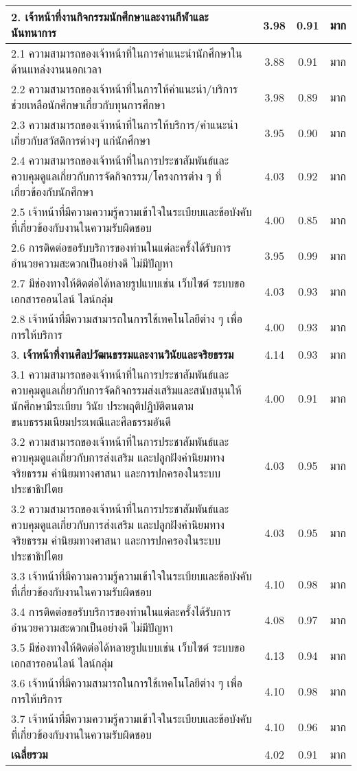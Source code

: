 \begin{longtable}{|>{\raggedright}p{9cm}|c|c|c|}
	2. \textbf{เจ้าหน้าที่งานกิจกรรมนักศึกษาและงานกีฬาและนันทนาการ} & 3.98 & 0.91 & มาก \\ \hline
	2.1 ความสามารถของเจ้าหน้าที่ในการคำแนะนำนักศึกษาในด้านแหล่งงานนอกเวลา & 3.88 & 0.91 & มาก \\ \hline
	2.2 ความสามารถของเจ้าหน้าที่ในการให้คำแนะนำ/บริการช่วยเหลือนักศึกษาเกี่ยวกับทุนการศึกษา & 3.98 & 0.89 & มาก \\ \hline
	2.3 ความสามารถของเจ้าหน้าที่ในการให้บริการ/คำแนะนำเกี่ยวกับสวัสดิการต่างๆ แก่นักศึกษา & 3.95 & 0.90 & มาก \\ \hline
	2.4 ความสามารถของเจ้าหน้าที่ในการประชาสัมพันธ์และควบคุมดูแลเกี่ยวกับการจัดกิจกรรม/โครงการต่าง ๆ ที่เกี่ยวข้องกับนักศึกษา & 4.03 & 0.92 & มาก \\ \hline
	2.5 เจ้าหน้าที่มีความความรู้ความเข้าใจในระเบียบและข้อบังคับที่เกี่ยวข้องกับงานในความรับผิดชอบ & 4.00 & 0.85 & มาก \\ \hline
	2.6 การติดต่อขอรับบริการของท่านในแต่ละครั้งได้รับการอำนวยความสะดวกเป็นอย่างดี ไม่มีปัญหา & 3.95 & 0.99 & มาก \\ \hline
	2.7 มีช่องทางให้ติดต่อได้หลายรูปแบบเช่น เว็บไซต์ ระบบขอเอกสารออนไลน์ ไลน์กลุ่ม & 4.03 & 0.93 & มาก \\ \hline
	2.8 เจ้าหน้าที่มีความสามารถในการใช้เทคโนโลยีต่าง ๆ เพื่อการให้บริการ & 4.00 & 0.93 & มาก \\ \hline
	3. \textbf{เจ้าหน้าที่งานศิลปวัฒนธรรมและงานวินัยและจริยธรรม} & 4.14 & 0.93 & มาก \\ \hline
	3.1 ความสามารถของเจ้าหน้าที่ในการประชาสัมพันธ์และควบคุมดูแลเกี่ยวกับการจัดกิจกรรมส่งเสริมและสนับสนุนให้นักศึกษามีระเบียบ วินัย ประพฤติปฏิบัติตนตามขนบธรรมเนียมประเพณีและศีลธรรมอันดี & 4.00 & 0.91 & มาก \\ \hline
	3.2 ความสามารถของเจ้าหน้าที่ในการประชาสัมพันธ์และควบคุมดูแลเกี่ยวกับการส่งเสริม และปลูกฝังค่านิยมทางจริยธรรม ค่านิยมทางศาสนา และการปกครองในระบบประชาธิปไตย & 4.03 & 0.95 & มาก \\ \hline
	3.2 ความสามารถของเจ้าหน้าที่ในการประชาสัมพันธ์และควบคุมดูแลเกี่ยวกับการส่งเสริม และปลูกฝังค่านิยมทางจริยธรรม ค่านิยมทางศาสนา และการปกครองในระบบประชาธิปไตย & 4.03 & 0.95 & มาก\\\hline
	3.3 เจ้าหน้าที่มีความความรู้ความเข้าใจในระเบียบและข้อบังคับที่เกี่ยวข้องกับงานในความรับผิดชอบ & 4.10 & 0.98 & มาก\\\hline
	3.4 การติดต่อขอรับบริการของท่านในแต่ละครั้งได้รับการอำนวยความสะดวกเป็นอย่างดี ไม่มีปัญหา & 4.08 & 0.97 & มาก\\\hline
	3.5 มีช่องทางให้ติดต่อได้หลายรูปแบบเช่น เว็บไซต์ ระบบขอเอกสารออนไลน์ ไลน์กลุ่ม & 4.13 & 0.94 & มาก\\\hline
	3.6 เจ้าหน้าที่มีความสามารถในการใช้เทคโนโลยีต่าง ๆ เพื่อการให้บริการ & 4.10 & 0.98 & มาก\\\hline
	3.7 เจ้าหน้าที่มีความความรู้ความเข้าใจในระเบียบและข้อบังคับที่เกี่ยวข้องกับงานในความรับผิดชอบ & 4.10 & 0.96 & มาก\\\hline
	\textbf{เฉลี่ยรวม}&4.02 & 0.91 & มาก\\\hline
\end{longtable}
